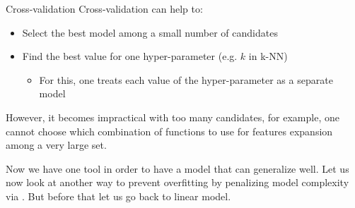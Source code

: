\begin{parag}{Cross-validation}
    Cross-validation can help to:
	\begin{itemize}
		\item Select the best model among a small number of candidates
		\item Find the best value for one hyper-parameter (e.g. $k$ in k-NN)
			\begin{itemize}
				\item For this, one treats each value of the hyper-parameter as a separate model
			\end{itemize}
	\end{itemize}
	However, it becomes impractical with too many candidates, for example, one cannot choose which combination of functions to use for features expansion among a very large set.
\end{parag}


Now we have one tool in order to have a model that can generalize well. Let us now look at another way to prevent overfitting by penalizing model complexity via . But before that let us go back to linear model.


